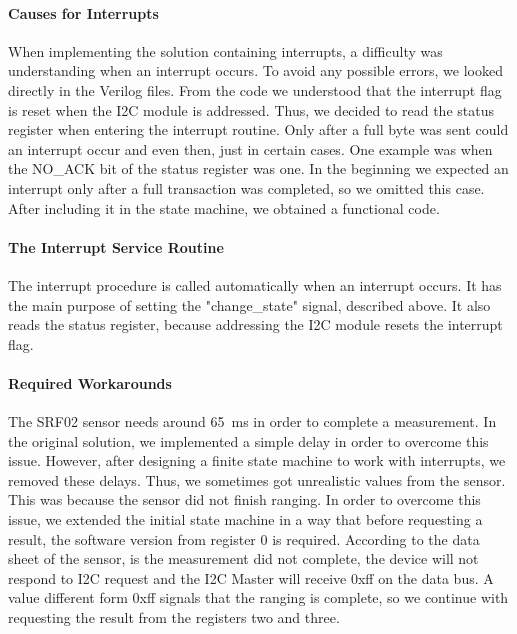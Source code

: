 			\paragraph{Causes for Interrupts} %
			\label{par:causes_for_interrupts}
				When implementing the solution containing interrupts, a difficulty was understanding when an interrupt occurs. To avoid any possible errors, we looked directly in the Verilog files. From the code we understood that the interrupt flag is reset when the I2C module is addressed. Thus, we decided to read the status register when entering the interrupt routine. Only after a full byte was sent could an interrupt occur and even then, just in certain cases. One example was when the NO_ACK bit of the status register was one. In the beginning we expected an interrupt only after a full transaction was completed, so we omitted this case. After including it in the state machine, we obtained a functional code.  
			
			\paragraph{The Interrupt Service Routine} %
			\label{par:impl_isr}
				The interrupt procedure is called automatically when an interrupt occurs. It has the main purpose of setting the "change\_state" signal, described above. It also reads the status register, because addressing the I2C module resets the interrupt flag.

			\paragraph{Required Workarounds} %
			\label{par:required_workarounds}
				The SRF02 sensor needs around \SI{65}{\milli\second} in order to complete a measurement. In the original solution, we implemented a simple delay in order to overcome this issue. However, after designing a finite state machine to work with interrupts, we removed these delays. Thus, we sometimes got unrealistic values from the sensor. This was because the sensor did not finish ranging.
				In order to overcome this issue, we extended the initial state machine in a way that before requesting a result, the software version from register 0 is required. According to the data sheet of the sensor, is the measurement did not complete, the device will not respond to I2C request and the I2C Master will receive 0xff on the data bus. A value different form 0xff signals that the ranging is complete, so we continue with requesting the result from the registers two and three.

